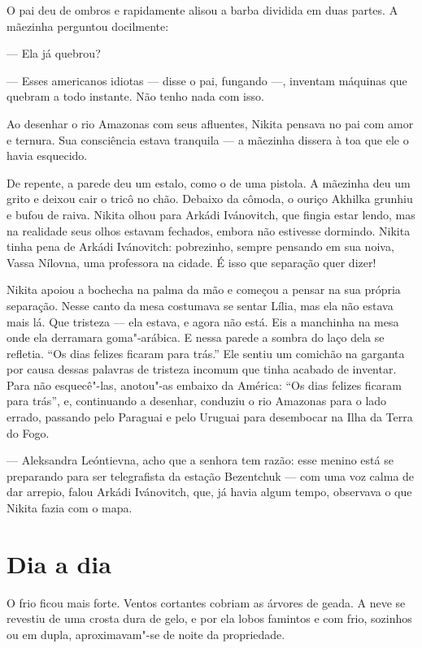 O pai deu de ombros e rapidamente alisou a barba dividida em duas
partes. A mãezinha perguntou docilmente:

--- Ela já quebrou?

--- Esses americanos idiotas --- disse o pai, fungando ---, inventam
máquinas que quebram a todo instante. Não tenho nada com isso.

Ao desenhar o rio Amazonas com seus afluentes, Nikita pensava no pai com
amor e ternura. Sua consciência estava tranquila --- a mãezinha dissera à toa que ele o havia esquecido.

De repente, a parede deu um estalo, como o de uma pistola. A mãezinha
deu um grito e deixou cair o tricô no chão. Debaixo da cômoda, o ouriço
Akhilka grunhiu e bufou de raiva. Nikita olhou para Arkádi Ivánovitch,
que fingia estar lendo, mas na realidade seus olhos estavam fechados,
embora não estivesse dormindo. Nikita tinha pena de Arkádi Ivánovitch:
pobrezinho, sempre pensando em sua noiva, Vassa Nílovna, uma professora
na cidade. É isso que separação quer dizer!

Nikita apoiou a bochecha na palma da mão e começou a pensar na sua
própria separação. Nesse canto da mesa costumava se sentar Lília, mas
ela não estava mais lá. Que tristeza --- ela estava, e agora não está.
Eis a manchinha na mesa onde ela derramara goma"-arábica. E nessa parede
a sombra do laço dela se refletia. ``Os dias felizes ficaram para
trás.'' Ele sentiu um comichão na garganta por causa dessas palavras
de tristeza incomum que tinha acabado de inventar. Para não esquecê"-las,
anotou"-as embaixo da América: ``Os dias felizes ficaram para trás'', e,
continuando a desenhar, conduziu o rio Amazonas para o lado errado,
passando pelo Paraguai e pelo Uruguai para desembocar na Ilha da Terra
do Fogo.

--- Aleksandra Leóntievna, acho que a senhora tem razão: esse menino
está se preparando para ser telegrafista da estação Bezentchuk --- com
uma voz calma de dar arrepio, falou Arkádi Ivánovitch, que, já havia
algum tempo, observava o que Nikita fazia com o mapa.

\chapter{Dia a dia}

O frio ficou mais forte. Ventos cortantes cobriam as árvores de geada. A
neve se revestiu de uma crosta dura de gelo, e por ela lobos famintos e
com frio, sozinhos ou em dupla, aproximavam"-se de noite da propriedade.

